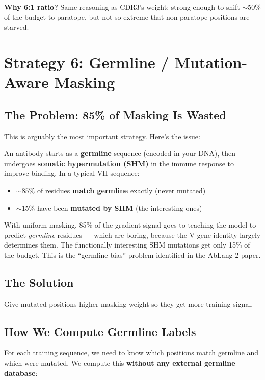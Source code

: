 \documentclass[11pt]{article}
\begin{document}
\textbf{Why 6:1 ratio?}
Same reasoning as CDR3's weight: strong enough to shift
$\sim$50\% of the budget to paratope, but not so extreme that
non-paratope positions are starved.

\section{Strategy 6: Germline / Mutation-Aware Masking}
\label{sec:germline}

\subsection{The Problem: 85\% of Masking Is Wasted}

This is arguably the most important strategy. Here's the issue:

An antibody starts as a \textbf{germline} sequence (encoded in
your DNA), then undergoes \textbf{somatic hypermutation (SHM)}
in the immune response to improve binding. In a typical VH
sequence:
\begin{itemize}
\item $\sim$85\% of residues \textbf{match germline} exactly
      (never mutated)
\item $\sim$15\% have been \textbf{mutated by SHM} (the
      interesting ones)
\end{itemize}

With uniform masking, 85\% of the gradient signal goes to
teaching the model to predict \emph{germline} residues --- which
are boring, because the V gene identity largely determines them.
The functionally interesting SHM mutations get only 15\% of the
budget. This is the ``germline bias'' problem identified in the
AbLang-2 paper.

\subsection{The Solution}
Give mutated positions higher masking weight so they get more
training signal.

\subsection{How We Compute Germline Labels}

For each training sequence, we need to know which positions match
germline and which were mutated. We compute this \textbf{without
any external germline database}:
\end{document}
